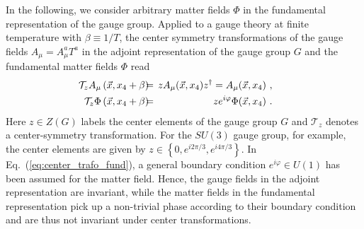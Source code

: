 \documentclass[final,twocolumn,merge,sort&compress]{elsarticle}
\def\Eq#1{Eq.~(\ref{#1})}
\begin{document}
In the following, we consider arbitrary matter fields $\Phi$ in the
fundamental representation of the gauge group. Applied to a gauge
theory at finite temperature with $\beta \equiv 1/T$, the center
symmetry transformations of the gauge fields $A_\mu = A_\mu^a T^a$ in
the adjoint representation of the gauge group $G$ and the fundamental
matter fields $\Phi$ read
\begin{eqnarray}
  \hspace{-0.6cm} \mathcal T_z A_\mu\left(\vec{x},x_4+\beta \right) \hspace{-0.2cm} & = & \hspace{-0.2cm} z A_\mu (\vec{x},x_4) z^\dag = A_\mu(\vec{x},x_4) \ , \label{eq:center_trafo_adj} \\
  \hspace{-0.6cm} \mathcal T_z \Phi\left(\vec{x},x_4+\beta\right) \hspace{-0.2cm} & = & \hspace{-0.2cm} z e^{i\varphi}\Phi(\vec{x},x_4) \ . \label{eq:center_trafo_fund} 
\end{eqnarray}
Here $z\in Z(G)$ labels the center elements of the gauge group $G$ and
$\mathcal T_z$ denotes a center-symmetry transformation. For the
$SU(3)$ gauge group, for example, the center elements are given by
$z \in \left\{0,e^{i2\pi/3},e^{i4\pi/3}\right\}$.  In
\Eq{eq:center_trafo_fund}, a general boundary condition
$e^{i\varphi}\in U(1)$ has been assumed for the matter field. Hence,
the gauge fields in the adjoint representation are invariant, while
the matter fields in the fundamental representation pick up a
non-trivial phase according to their boundary condition and are thus
not invariant under center transformations.
\end{document}
